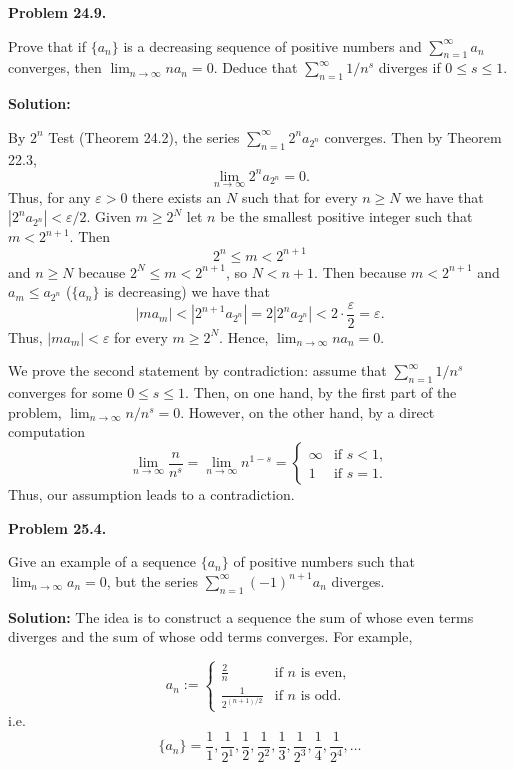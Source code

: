 \documentclass[12pt]{article}
\def\black{\color{black}}
\def\green{\color{rltgreen}}
\renewcommand\|{\ | \ }
\newcommand\ra{\rightarrow}
\def\pb#1{{\green \bf Problem #1.}\hskip 8pt \black}
\def\sol{\textbf{Solution:}}
\def\sequence#1{$\{{#1}_n\}$}
\def\sumint#1{\sum_{#1=1}^\infty}
\def\sumseries#1#2{$\sumint#1 #2_{#1}$}
\newcommand\e\varepsilon
\newcommand\limn{\lim_{n \ra \infty}}
\newcommand\foranyeps{for any $\e > 0$ }
\newcommand\thereexistsN{there exists an $N$ such that for every $n \geq N$ }
\begin{document}
\pb {24.9}

Prove that if \sequence a is a decreasing sequence of positive numbers and
\sumseries n a converges, then $\limn n a_n = 0$. Deduce that 
$\sumint n 1/n^{s}$ diverges if $0 \leq s \leq 1$.

\sol

By $2^n$ Test (Theorem 24.2), the series $\sumint n 2^n a_{2^n}$ converges.
Then by Theorem 22.3,
\[
\limn 2^n a_{2^n} = 0.
\]
Thus, \foranyeps \thereexistsN we have that $|2^n a_{2^n}| < \e / 2$. 
Given $m \geq 2^N$ let $n$ be the smallest positive integer such that 
$m < 2^{n + 1}$. Then
\[
2^n \leq m < 2^{n + 1}
\]
and $n \geq N$ because $2^N \leq m < 2^{n + 1}$, so $N < n + 1$.
Then because $m < 2^{n + 1}$ and $a_m \leq a_{2^n}$ (\sequence a is
decreasing) we have that
\[
|m a_m| < |2^{n + 1} a_{2^n}| = 2 |2^n a_{2^n}| < 2 \cdot \frac \e 2 = \e.
\]
Thus, $|m a_m| < \e$ for every $m \geq 2^N$. Hence, $\limn n a_n = 0$.

We prove the second statement by contradiction: assume that 
$\sumint n 1/n^{s}$ converges for some $0 \leq s \leq 1$. Then, on one hand,
by the first part of the problem, $\limn n/n^{s} = 0$. However, on the other
hand, by a direct computation
\[
\limn \frac n {n^{s}} = \limn n^{1 - s} 
= \left\{ \begin{array}{ll}
	\infty & \text{if }s < 1,\\
	1 & \text{if }s = 1.
\end{array}\right.
\]
Thus, our assumption leads to a contradiction. 

\pb {25.4}

Give an example of a sequence \sequence a of positive numbers such that 
$\limn a_n = 0$, but the series $\sumint n (-1)^{n + 1} a_n$ diverges.

\sol
The idea is to construct a sequence the sum of whose even terms diverges
and the sum of whose odd terms converges. For example, 

\[
a_n := \left\{ \begin{array}{ll}
	\frac 2 n & \text{if }n\text{ is even},\\
	\frac 1 {2^{(n+1)/2}} & \text{if }n\text{ is odd}.
\end{array}\right.
\]
i.e. 
\[
\{a_n\} = \frac 1 1, \frac 1 {2^1}, \frac 1 2, \frac 1 {2^2},
\frac 1 3, \frac 1 {2^3}, \frac 1 4, \frac 1 {2^4}, \ldots
\]
\end{document}
